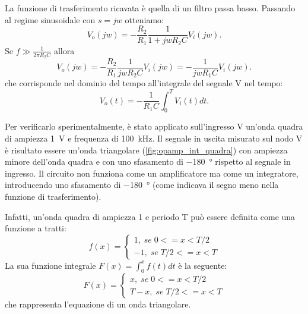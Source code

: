 \noindent
La funzione di trasferimento ricavata è quella di un filtro passa basso. Passando al regime sinusoidale con $s=jw$ otteniamo:
\begin{equation}
	V_o(jw)=-\frac{R_2}{R_1}\frac{1}{1+jwR_2C}V_i(jw).
\end{equation}
Se $f\gg\frac{1}{2\pi R_2C}$ allora 
\begin{equation}
	V_o(jw)=-\frac{R_2}{R_1}\frac{1}{jwR_2C}V_i(jw)=-\frac{1}{jwR_1C}V_i(jw).
\end{equation}
che corrisponde nel dominio del tempo all'integrale del segnale V nel tempo:
\begin{equation}
	V_o(t)=-\frac{1}{R_1C}\int_0^TV_i(t) dt.
\end{equation}

\noindent
Per verificarlo sperimentalmente, è stato applicato sull'ingresso V un'onda quadra di ampiezza \SI{1}{\volt} e frequenza di \SI{100}{\kilo\hertz}. Il segnale in uscita misurato sul nodo V è risultato essere un'onda triangolare (\Fig\ref{fig:opamp_int_quadra}) con ampiezza minore dell'onda quadra e con uno sfasamento di \SI{-180}{\degree} rispetto al segnale in ingresso. Il circuito non funziona come un amplificatore ma come un integratore, introducendo uno sfasamento di \SI{-180}{\degree} (come indicava il segno meno nella funzione di trasferimento).

\noindent
Infatti, un'onda quadra di ampiezza 1 e periodo T può essere definita come una funzione a tratti:
\begin{equation}
	f(x)=
	\begin{cases}
		1,\;se\;0<=x<T/2 \\
		-1,\;se\;T/2<=x<T 
	\end{cases}
\end{equation}
La sua funzione integrale $F(x)=\int_0^xf(t)dt$ è la seguente:
\begin{equation}
	F(x)=
	\begin{cases}
		x,\;se\;0<=x<T/2 \\
		T-x,\;se\;T/2<=x<T 
	\end{cases}
\end{equation}
che rappresenta l'equazione di un onda triangolare.

